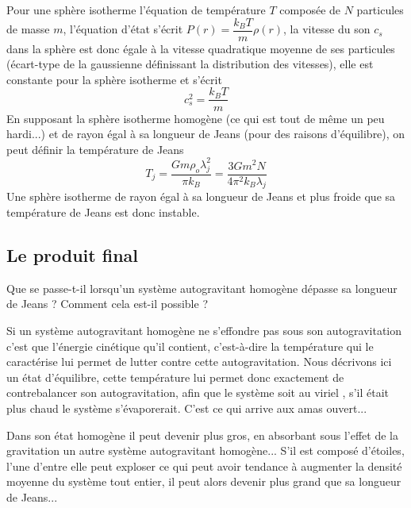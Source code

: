 Pour une sphère isotherme l'équation de température $T$  composée de $N$ particules de masse $m$, l'équation d'état s'écrit $P(r)=\dfrac{k_B T}{m}\rho (r)$, la vitesse du son $c_s$ dans la sphère est donc égale à la vitesse quadratique moyenne de ses particules (écart-type de la gaussienne définissant la distribution des vitesses), elle est constante pour la sphère isotherme et s'écrit
$$
c_s^2= \dfrac{ k_B T}{m}
$$
En supposant la sphère isotherme homogène (ce qui est tout de même un peu hardi...)  et de rayon égal à sa longueur de Jeans (pour des raisons d'équilibre), on peut définir la température de Jeans 
\begin{equation}
T_j= \frac{Gm\rho_{o}\lambda_{j}^2}{\pi k_B}=\frac{3Gm^2N}{4\pi^2 k_B\lambda_{j}}
\end{equation}
Une sphère isotherme de rayon égal à sa longueur de Jeans et plus froide que sa température de Jeans est donc instable.

\subsection{Le produit final}

Que se passe-t-il lorsqu'un système autogravitant homogène dépasse sa longueur de Jeans ?
Comment cela est-il possible ?

Si un système autogravitant homogène ne s'effondre pas sous son autogravitation c'est que l'énergie cinétique qu'il contient, c'est-à-dire la température qui le caractérise lui permet de lutter contre cette autogravitation. Nous décrivons ici un état d'équilibre, cette température lui permet donc exactement de contrebalancer son autogravitation, afin que le système soit \og au viriel \fg, s'il était plus chaud le système s'évaporerait. C'est ce qui arrive aux amas ouvert...

Dans son état homogène il peut devenir plus gros, en absorbant sous l'effet de la gravitation un autre système autogravitant homogène... S'il est composé d'étoiles, l'une d'entre elle peut exploser ce qui peut avoir tendance à augmenter la densité moyenne du système tout entier, il peut alors devenir plus grand que sa longueur de Jeans...

